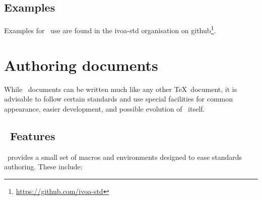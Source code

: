 \documentclass[11pt,a4paper]{ivoa}
\begin{document}
\subsection{Examples}

Examples for \ivoatex\ use are found in the ivoa-std organisation on
github\footnote{\url{https://github.com/ivoa-std}}.


\section{Authoring documents}
\label{sect:authoring}

While \ivoatex\ documents can be written much like any other \TeX\
document, it is advisable to follow certain standards and use special
facilities for common appearance, easier development, and possible
evolution of \ivoatex\ itself.

\subsection{\ivoatex\ Features}

\ivoatex\ provides a small set of macros and environments designed
to ease standards authoring.  These include:
\end{document}
